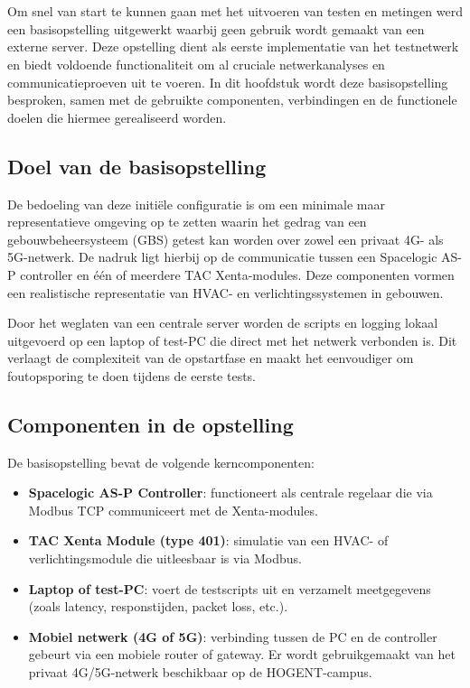 \chapter{}%
\label{ch:basisopstelling}

Om snel van start te kunnen gaan met het uitvoeren van testen en metingen werd een basisopstelling uitgewerkt waarbij geen gebruik wordt gemaakt van een externe server. Deze opstelling dient als eerste implementatie van het testnetwerk en biedt voldoende functionaliteit om al cruciale netwerkanalyses en communicatieproeven uit te voeren. In dit hoofdstuk wordt deze basisopstelling besproken, samen met de gebruikte componenten, verbindingen en de functionele doelen die hiermee gerealiseerd worden.

\section*{Doel van de basisopstelling}

De bedoeling van deze initiële configuratie is om een minimale maar representatieve omgeving op te zetten waarin het gedrag van een gebouwbeheersysteem (GBS) getest kan worden over zowel een privaat 4G- als 5G-netwerk. De nadruk ligt hierbij op de communicatie tussen een Spacelogic AS-P controller en één of meerdere TAC Xenta-modules. Deze componenten vormen een realistische representatie van HVAC- en verlichtingssystemen in gebouwen.

Door het weglaten van een centrale server worden de scripts en logging lokaal uitgevoerd op een laptop of test-PC die direct met het netwerk verbonden is. Dit verlaagt de complexiteit van de opstartfase en maakt het eenvoudiger om foutopsporing te doen tijdens de eerste tests.

\section*{Componenten in de opstelling}

De basisopstelling bevat de volgende kerncomponenten:
\begin{itemize}
    \item \textbf{Spacelogic AS-P Controller}: functioneert als centrale regelaar die via Modbus TCP communiceert met de Xenta-modules.
    \item \textbf{TAC Xenta Module (type 401)}: simulatie van een HVAC- of verlichtingsmodule die uitleesbaar is via Modbus.
    \item \textbf{Laptop of test-PC}: voert de testscripts uit en verzamelt meetgegevens (zoals latency, responstijden, packet loss, etc.).
    \item \textbf{Mobiel netwerk (4G of 5G)}: verbinding tussen de PC en de controller gebeurt via een mobiele router of gateway. Er wordt gebruikgemaakt van het privaat 4G/5G-netwerk beschikbaar op de HOGENT-campus.
\end{itemize}

